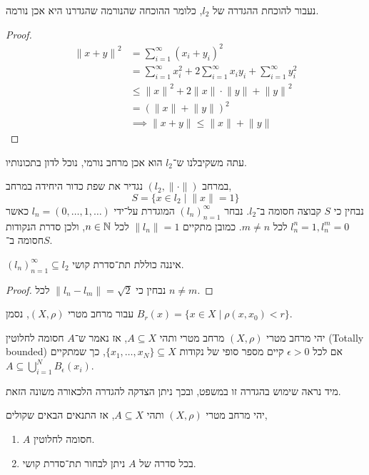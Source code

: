 נעבור להוכחת ההגדרה של $l_2$, כלומר ההוכחה שהנורמה שהגדרנו היא אכן נורמה.
\begin{proof}
	\begin{align*}
		{\lVert x + y \rVert}^2
		& = \sum_{i = 1}^{\infty} {(x_i + y_i)}^2 \\
		& = \sum_{i = 1}^{\infty} x_i^2 + 2 \sum_{i = 1}^{\infty} x_i y_i + \sum_{i = 1}^{\infty} y_i^2 \\
		& \le {\lVert x\rVert}^2 + 2 \lVert x \rVert \cdot \lVert y \rVert + {\lVert y \rVert}^2 \\
		& = {(\lVert x \rVert + \lVert y \rVert)}^2 \\
		& \implies \lVert x + y \rVert \le \lVert x \rVert + \lVert y \rVert
	\end{align*}
\end{proof}
עתה משקיבלנו ש־$l_2$ הוא אכן מרחב נורמי, נוכל לדון בתכונותיו.
\begin{example}
	במרחב $(l_2, \lVert \cdot \rVert)$ נגדיר את שפת כדור היחידה במרחב,
	\[
		S = \{ x \in l_2 \mid \lVert x \rVert = 1 \}
	\]
	נבחין כי $S$ קבוצה חסומה ב־$l_2$.
	נבחר ${(l_n)}_{n = 1}^\infty$ המוגדרת על־ידי $l_n = (0, \dots, 1, \dots)$ כאשר $l_n^n = 1, l_n^m = 0$ לכל $m \ne n$.
	כמובן מתקיים $\lVert l_n \rVert = 1$ לכל $n \in \mathbb{N}$, ולכן סדרת הנקודות חסומה ב־$S$.
\end{example}
\begin{proposition}
	${(l_n)}_{n = 1}^\infty \subseteq l_2$ איננה כוללת תת־סדרת קושי.
\end{proposition}
\begin{proof}
	נבחין כי $\lVert l_n - l_m \rVert = \sqrt{2}$ לכל $n \ne m$.
\end{proof}
\begin{notation}[כדור]
	עבור מרחב מטרי $(X, \rho)$, נסמן $B_r(x) = \{ x \in X \mid \rho(x, x_0) < r \}$.
\end{notation}
\begin{definition}
	יהי מרחב מטרי $(X, \rho)$ מרחב מטרי ותהי $A \subseteq X$, אז נאמר ש־$A$ חסומה לחלוטין (Totally bounded) אם לכל $\epsilon > 0$ קיים מספר סופי של נקודות $\{ x_1, \dots, x_N \} \subseteq X$,
	כך שמתקיים $A \subseteq \bigcup_{i = 1}^N B_\epsilon(x_i)$.
\end{definition}
מיד נראה שימוש בהגדרה זו במשפט, ובכך ניתן הצדקה להגדרה הלכאורה משונה הזאת.
\begin{theorem}\label{totally_bounded_set_equivalecy_theorem}
	יהי מרחב מטרי $(X, \rho)$ ותהי $A \subseteq X$, אז התנאים הבאים שקולים,
	\begin{enumerate}
		\item $A$ חסומה לחלוטין.
		\item בכל סדרה של $A$ ניתן לבחור תת־סדרת קושי.
	\end{enumerate}
\end{theorem}
